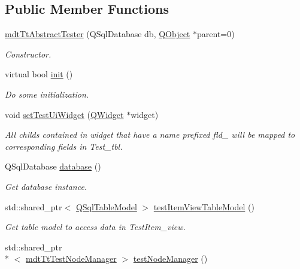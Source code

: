 \subsection*{Public Member Functions}
\begin{DoxyCompactItemize}
\item 
\hyperlink{classmdt_tt_abstract_tester_a8585d02e83ba1512b59d5e3984540b0a}{mdt\-Tt\-Abstract\-Tester} (Q\-Sql\-Database db, \hyperlink{class_q_object}{Q\-Object} $\ast$parent=0)
\begin{DoxyCompactList}\small\item\em Constructor. \end{DoxyCompactList}\item 
virtual bool \hyperlink{classmdt_tt_abstract_tester_a1066de965e6621c9c1fe7abdf5d7d23c}{init} ()
\begin{DoxyCompactList}\small\item\em Do some initialization. \end{DoxyCompactList}\item 
void \hyperlink{classmdt_tt_abstract_tester_a7b6e46a5e8e3c22375e6462f09241aea}{set\-Test\-Ui\-Widget} (\hyperlink{class_q_widget}{Q\-Widget} $\ast$widget)
\begin{DoxyCompactList}\small\item\em All childs contained in widget that have a name prefixed fld\-\_\- will be mapped to corresponding fields in Test\-\_\-tbl. \end{DoxyCompactList}\item 
Q\-Sql\-Database \hyperlink{classmdt_tt_abstract_tester_a43687d08109c032bc83ed287e8fdecc4}{database} ()
\begin{DoxyCompactList}\small\item\em Get database instance. \end{DoxyCompactList}\item 
std\-::shared\-\_\-ptr$<$ \hyperlink{class_q_sql_table_model}{Q\-Sql\-Table\-Model} $>$ \hyperlink{classmdt_tt_abstract_tester_ae8e3acab53e0d873a9eb963cfd3c71f7}{test\-Item\-View\-Table\-Model} ()
\begin{DoxyCompactList}\small\item\em Get table model to access data in Test\-Item\-\_\-view. \end{DoxyCompactList}\item 
std\-::shared\-\_\-ptr\\*
$<$ \hyperlink{classmdt_tt_test_node_manager}{mdt\-Tt\-Test\-Node\-Manager} $>$ \hyperlink{classmdt_tt_abstract_tester_a7b8351e2214a3bfc57d38bfeab3e0342}{test\-Node\-Manager} ()

\end{DoxyCompactItemize}
